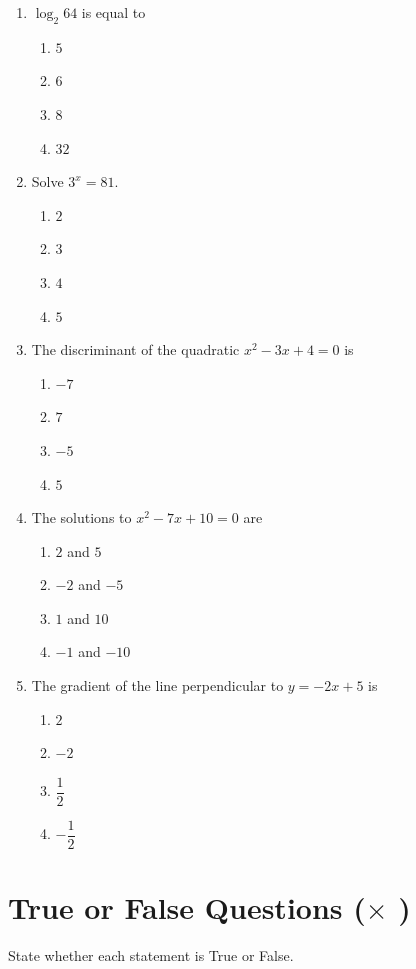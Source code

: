 \documentclass{sbs-exam}
\begin{document}
\begin{enumerate}
    \item $\log_2 64$ is equal to
    \begin{enumerate}
        \item $5$
        \item $6$
        \item $8$
        \item $32$
    \end{enumerate}

    \item Solve $3^x = 81$.
    \begin{enumerate}
        \item $2$
        \item $3$
        \item $4$
        \item $5$
    \end{enumerate}

    \item The discriminant of the quadratic $x^2 - 3x + 4 = 0$ is
    \begin{enumerate}
        \item $-7$
        \item $7$
        \item $-5$
        \item $5$
    \end{enumerate}

    \item The solutions to $x^2 - 7x + 10 = 0$ are
    \begin{enumerate}
        \item $2$ and $5$
        \item $-2$ and $-5$
        \item $1$ and $10$
        \item $-1$ and $-10$
    \end{enumerate}

    \item The gradient of the line perpendicular to $y = -2x + 5$ is
    \begin{enumerate}
        \item $2$
        \item $-2$
        \item $\dfrac{1}{2}$
        \item $-\dfrac{1}{2}$
    \end{enumerate}
\end{enumerate}

\makeatletter
\section*{True or False Questions (\@SAQ $\times$ \@SAQNo)}
\makeatother
State whether each statement is True or False.
\end{document}
